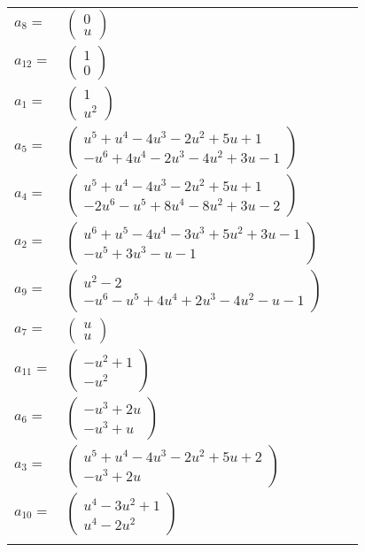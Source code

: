 \documentclass[1p]{elsarticle_modified}
\theoremstyle{definition}
\begin{document}
\begin{tabular}{m{7pt} m{180pt} m{7pt} m{180pt} }
\flushright $a_{8}=$&$\begin{pmatrix}0\\u\end{pmatrix}$ \\
\flushright $a_{12}=$&$\begin{pmatrix}1\\0\end{pmatrix}$ \\
\flushright $a_{1}=$&$\begin{pmatrix}1\\u^2\end{pmatrix}$ \\
\flushright $a_{5}=$&$\begin{pmatrix}u^5+u^4-4 u^3-2 u^2+5 u+1\\- u^6+4 u^4-2 u^3-4 u^2+3 u-1\end{pmatrix}$ \\
\flushright $a_{4}=$&$\begin{pmatrix}u^5+u^4-4 u^3-2 u^2+5 u+1\\-2 u^6- u^5+8 u^4-8 u^2+3 u-2\end{pmatrix}$ \\
\flushright $a_{2}=$&$\begin{pmatrix}u^6+u^5-4 u^4-3 u^3+5 u^2+3 u-1\\- u^5+3 u^3- u-1\end{pmatrix}$ \\
\flushright $a_{9}=$&$\begin{pmatrix}u^2-2\\- u^6- u^5+4 u^4+2 u^3-4 u^2- u-1\end{pmatrix}$ \\
\flushright $a_{7}=$&$\begin{pmatrix}u\\u\end{pmatrix}$ \\
\flushright $a_{11}=$&$\begin{pmatrix}- u^2+1\\- u^2\end{pmatrix}$ \\
\flushright $a_{6}=$&$\begin{pmatrix}- u^3+2 u\\- u^3+u\end{pmatrix}$ \\
\flushright $a_{3}=$&$\begin{pmatrix}u^5+u^4-4 u^3-2 u^2+5 u+2\\- u^3+2 u\end{pmatrix}$ \\
\flushright $a_{10}=$&$\begin{pmatrix}u^4-3 u^2+1\\u^4-2 u^2\end{pmatrix}$\\&\end{tabular}
\end{document}
